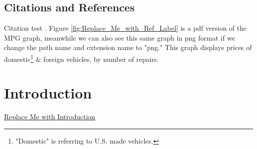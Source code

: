 \documentclass[12pt]{article}
\begin{document}


\subsection{Citations and References}

Citation test \parencite{storer2023sweet}. 
Figure \ref{fig:Replace_Me_with_Ref_Label} is a pdf version of 
the MPG graph, meanwhile we can also see this same graph in png format 
if we change the path name and extension name to "png." 
This graph displays prices of 
domestic\footnote
{
	"Domestic" is referring to U.S. made vehicles.\label{fnote:domestic}
} 
\& foreign vehicles, by number of repairs.

\section{Introduction}

\underline{Replace Me with Introduction}


\printbibliography%
\end{document}
